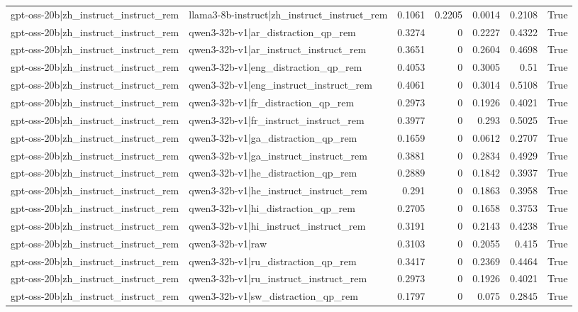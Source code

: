 \begin{table}
\begin{tabular}{l l r r r r l}
gpt-oss-20b|zh_instruct_instruct_rem & llama3-8b-instruct|zh_instruct_instruct_rem & 0.1061 & 0.2205 & 0.0014 & 0.2108 & True \\
gpt-oss-20b|zh_instruct_instruct_rem & qwen3-32b-v1|ar_distraction_qp_rem & 0.3274 & 0 & 0.2227 & 0.4322 & True \\
gpt-oss-20b|zh_instruct_instruct_rem & qwen3-32b-v1|ar_instruct_instruct_rem & 0.3651 & 0 & 0.2604 & 0.4698 & True \\
gpt-oss-20b|zh_instruct_instruct_rem & qwen3-32b-v1|eng_distraction_qp_rem & 0.4053 & 0 & 0.3005 & 0.51 & True \\
gpt-oss-20b|zh_instruct_instruct_rem & qwen3-32b-v1|eng_instruct_instruct_rem & 0.4061 & 0 & 0.3014 & 0.5108 & True \\
gpt-oss-20b|zh_instruct_instruct_rem & qwen3-32b-v1|fr_distraction_qp_rem & 0.2973 & 0 & 0.1926 & 0.4021 & True \\
gpt-oss-20b|zh_instruct_instruct_rem & qwen3-32b-v1|fr_instruct_instruct_rem & 0.3977 & 0 & 0.293 & 0.5025 & True \\
gpt-oss-20b|zh_instruct_instruct_rem & qwen3-32b-v1|ga_distraction_qp_rem & 0.1659 & 0 & 0.0612 & 0.2707 & True \\
gpt-oss-20b|zh_instruct_instruct_rem & qwen3-32b-v1|ga_instruct_instruct_rem & 0.3881 & 0 & 0.2834 & 0.4929 & True \\
gpt-oss-20b|zh_instruct_instruct_rem & qwen3-32b-v1|he_distraction_qp_rem & 0.2889 & 0 & 0.1842 & 0.3937 & True \\
gpt-oss-20b|zh_instruct_instruct_rem & qwen3-32b-v1|he_instruct_instruct_rem & 0.291 & 0 & 0.1863 & 0.3958 & True \\
gpt-oss-20b|zh_instruct_instruct_rem & qwen3-32b-v1|hi_distraction_qp_rem & 0.2705 & 0 & 0.1658 & 0.3753 & True \\
gpt-oss-20b|zh_instruct_instruct_rem & qwen3-32b-v1|hi_instruct_instruct_rem & 0.3191 & 0 & 0.2143 & 0.4238 & True \\
gpt-oss-20b|zh_instruct_instruct_rem & qwen3-32b-v1|raw & 0.3103 & 0 & 0.2055 & 0.415 & True \\
gpt-oss-20b|zh_instruct_instruct_rem & qwen3-32b-v1|ru_distraction_qp_rem & 0.3417 & 0 & 0.2369 & 0.4464 & True \\
gpt-oss-20b|zh_instruct_instruct_rem & qwen3-32b-v1|ru_instruct_instruct_rem & 0.2973 & 0 & 0.1926 & 0.4021 & True \\
gpt-oss-20b|zh_instruct_instruct_rem & qwen3-32b-v1|sw_distraction_qp_rem & 0.1797 & 0 & 0.075 & 0.2845 & True \\

\end{tabular}
\end{table}
